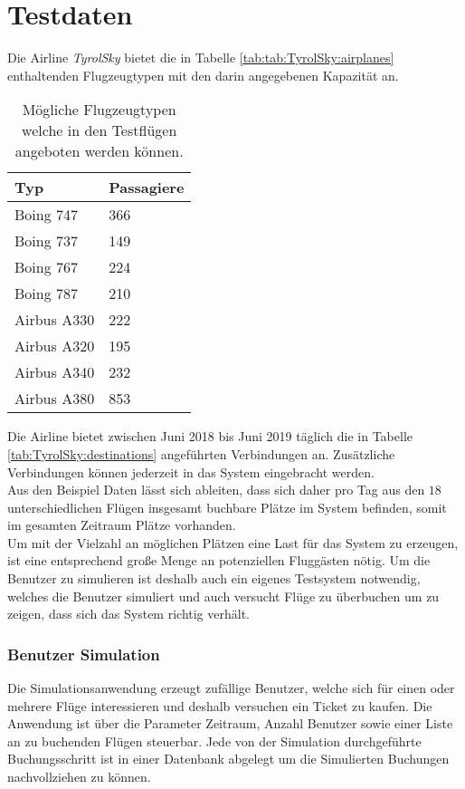 \section{Testdaten}
Die Airline \textit{TyrolSky} bietet die in Tabelle \ref{tab:tab:TyrolSky:airplanes} enthaltenden Flugzeugtypen mit den darin angegebenen Kapazität an. 
\begin{table}[]
    \centering
    \begin{tabular}{ll}
    Typ & Passagiere \\ \hline
    Boing 747    &    366       \\
    Boing 737    &    149       \\
    Boing 767    &    224       \\
    Boing 787    &    210       \\
    Airbus A330    &    222       \\
    Airbus A320    &    195       \\
    Airbus A340    &    232       \\
    Airbus A380    &    853       \\    
\end{tabular}
\caption{Mögliche Flugzeugtypen welche in den Testflügen angeboten werden können.}
\label{tab:TyrolSky:airplanes}
\end{table}
Die Airline bietet zwischen Juni 2018 bis Juni 2019 täglich die in Tabelle \ref{tab:TyrolSky:destinations} angeführten Verbindungen an. Zusätzliche Verbindungen können jederzeit in das System eingebracht werden. \\
Aus den Beispiel Daten lässt sich ableiten, dass sich daher pro Tag aus den $18$ unterschiedlichen Flügen insgesamt  buchbare Plätze im System befinden, somit im gesamten Zeitraum  Plätze vorhanden. \\
Um mit der Vielzahl an möglichen Plätzen eine Last für das System zu erzeugen, ist eine entsprechend große Menge an potenziellen Fluggästen nötig. Um die Benutzer zu simulieren ist deshalb auch ein eigenes Testsystem notwendig, welches die Benutzer simuliert und auch versucht Flüge zu überbuchen um zu zeigen, dass sich das System richtig verhält. \\

\subsubsection{Benutzer Simulation}
Die Simulationsanwendung erzeugt zufällige Benutzer, welche sich für einen oder mehrere Flüge interessieren und deshalb versuchen ein Ticket zu kaufen. Die Anwendung ist über die Parameter Zeitraum, Anzahl Benutzer sowie einer Liste an zu buchenden Flügen steuerbar. Jede von der Simulation durchgeführte Buchungsschritt ist in einer Datenbank abgelegt um die Simulierten Buchungen nachvollziehen zu können.

